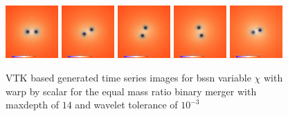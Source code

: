 \begin{figure}[H]
	\centering
	\includegraphics[width=0.18\textwidth]{figs/vtk/r1/img_slice_wbs_000000.png}
	\includegraphics[width=0.18\textwidth]{figs/vtk/r1/img_slice_wbs_000020.png}
	\includegraphics[width=0.18\textwidth]{figs/vtk/r1/img_slice_wbs_000040.png}
	\includegraphics[width=0.18\textwidth]{figs/vtk/r1/img_slice_wbs_000060.png}
	\includegraphics[width=0.18\textwidth]{figs/vtk/r1/img_slice_wbs_000100.png}
	\caption{VTK based generated time series images for bssn variable $\chi$ with warp by scalar for the equal mass ratio binary merger with maxdepth of $14$ and wavelet tolerance of $10^{-3}$ \label{fig:vtk:r1}}
\end{figure}
